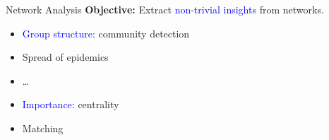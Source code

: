 \documentclass[10pt,titlepage,english,presentation]{beamer}
\newcommand{\emphcolor}{blue}
\renewcommand{\emph}[1]{\textcolor{\emphcolor}{#1}}
\begin{document}
\begin{frame}[t]{Network Analysis}
\textbf{Objective:} Extract \emph{non-trivial insights} from networks.
\begin{minipage}[t]{.55\textwidth}
\begin{itemize}
    \small
\item<2-> \emph{Group structure:} community detection
\item<3-> Spread of epidemics
\item<3-> \dots
\end{itemize}\bigskip

\begin{itemize}
    \small
    \item<4-> \emph{Importance:} centrality
    \item<5-> Matching
\end{itemize}
\end{minipage}\hfill
\begin{minipage}[t]{.45\textwidth}
\end{minipage}
\end{frame}
\end{document}
